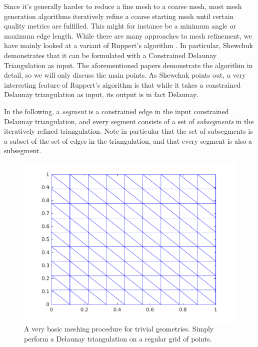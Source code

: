 \documentclass[10pt,a4paper]{article}
\begin{document}
Since it's generally harder to reduce a fine mesh to a coarse mesh, most mesh generation algorithms iteratively refine a coarse starting mesh until certain quality metrics are fulfilled. This might for instance be a minimum angle or maximum edge length. While there are many approaches to mesh refinement, we have mainly looked at a variant of Ruppert's algorithm \cite{ruppert}. In particular, Shewchuk \cite{shewchuk} demonstrates that it can be formulated with a Constrained Delaunay Triangulation as input. The aforementioned papers demonstrate the algorithm in detail, so we will only discuss the main points. As Shewchuk points out, a very interesting feature of Ruppert's algorithm is that while it takes a constrained Delaunay triangulation as input, its output is in fact Delaunay.

In the following, a \emph{segment} is a constrained edge in the input constrained Delaunay triangulation, and every segment consists of a set of \emph{subsegments} in the iteratively refined triangulation. Note in particular that the set of subsegments is a subset of the set of edges in the triangulation, and that every segment is also a subsegment.








\begin{figure}[htb]
	\centering
    \includegraphics[width=\textwidth]{figures/basic_rect_mesh}
    \caption{A very basic meshing procedure for trivial geometries. Simply perform a Delaunay triangulation on a regular grid of points.}
    \label{fig:basic_rect_mesh}
\end{figure}
\end{document}
